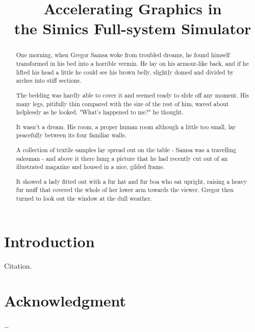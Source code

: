 \documentclass[conference]{IEEEtran}
\begin{document}
\title{%
  Accelerating Graphics in\\
  the Simics Full-system Simulator}

\author{
}

\maketitle

\begin{abstract}
One morning, when Gregor Samsa woke from
troubled dreams, he found himself transformed in his bed into
a horrible vermin. He lay on his armour-like back, and if he
lifted his head a little he could see his brown belly,
slightly domed and divided by arches into stiff sections.

The bedding was hardly able to cover it
and seemed ready to slide off any moment. His many legs,
pitifully thin compared with the size of the rest of him,
waved about helplessly as he looked. "What's happened to me?"
he thought.

It wasn't a dream. His room, a proper human
room although a little too small, lay peacefully between its
four familiar walls.

A collection of textile samples lay spread
out on the table - Samsa was a travelling salesman - and above
it there hung a picture that he had recently cut out of an
illustrated magazine and housed in a nice, gilded frame.

It showed a lady fitted out with a fur
hat and fur boa who sat upright, raising a heavy fur muff that
covered the whole of her lower arm towards the viewer. Gregor
then turned to look out the window at the dull weather.
\end{abstract}

%
\IEEEpeerreviewmaketitle

\section{Introduction}
Citation\cite{IEEEexample:article_typical}.

\section*{Acknowledgment}
\ldots



\end{document}
